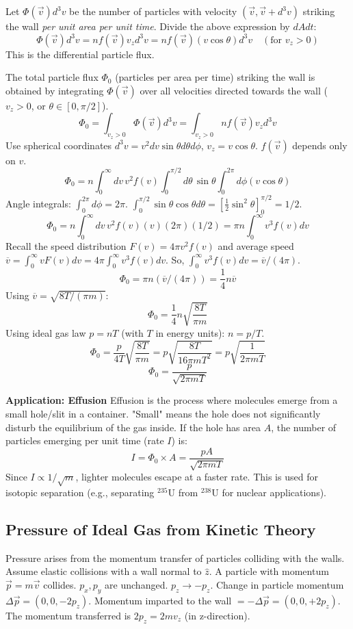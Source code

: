 \documentclass[11pt]{article}
\newcommand{\avg}[1]{\overline{#1}}
\begin{document}
Let $\Phi(\vec{v}) d^3v$ be the number of particles with velocity $(\vec{v}, \vec{v}+d^3v)$ striking the wall \emph{per unit area per unit time}. Divide the above expression by $dA dt$:
\[ \Phi(\vec{v}) d^3v = n f(\vec{v}) v_z d^3v = n f(\vec{v}) (v \cos\theta) d^3v \quad (\text{for } v_z>0) \]
This is the differential particle flux.

The total particle flux $\Phi_0$ (particles per area per time) striking the wall is obtained by integrating $\Phi(\vec{v})$ over all velocities directed towards the wall ($v_z > 0$, or $\theta \in [0, \pi/2]$).
\[ \Phi_0 = \int_{v_z>0} \Phi(\vec{v}) d^3v = \int_{v_z>0} n f(\vec{v}) v_z d^3v \]
Use spherical coordinates $d^3v = v^2 dv \sin\theta d\theta d\phi$, $v_z = v \cos\theta$. $f(\vec{v})$ depends only on $v$.
\[ \Phi_0 = n \int_0^\infty dv \, v^2 f(v) \int_0^{\pi/2} d\theta \, \sin\theta \int_0^{2\pi} d\phi (v \cos\theta) \]
Angle integrals: $\int_0^{2\pi} d\phi = 2\pi$. $\int_0^{\pi/2} \sin\theta \cos\theta d\theta = [\frac{1}{2}\sin^2\theta]_0^{\pi/2} = 1/2$.
\[ \Phi_0 = n \int_0^\infty dv \, v^2 f(v) (v) (2\pi) (1/2) = \pi n \int_0^\infty v^3 f(v) dv \]
Recall the speed distribution $F(v) = 4\pi v^2 f(v)$ and average speed $\avg{v} = \int_0^\infty v F(v) dv = 4\pi \int_0^\infty v^3 f(v) dv$.
So, $\int_0^\infty v^3 f(v) dv = \avg{v} / (4\pi)$.
\[ \Phi_0 = \pi n (\avg{v} / (4\pi)) = \frac{1}{4} n \avg{v} \]
Using $\avg{v} = \sqrt{8T/(\pi m)}$:
\[ \Phi_0 = \frac{1}{4} n \sqrt{\frac{8T}{\pi m}} \]
Using ideal gas law $p = nT$ (with $T$ in energy units): $n=p/T$.
\[ \Phi_0 = \frac{p}{4T} \sqrt{\frac{8T}{\pi m}} = p \sqrt{\frac{8T}{16 \pi m T^2}} = p \sqrt{\frac{1}{2\pi m T}} \]
\[ \Phi_0 = \frac{p}{\sqrt{2\pi m T}} \]

\textbf{Application: Effusion}
Effusion is the process where molecules emerge from a small hole/slit in a container. "Small" means the hole does not significantly disturb the equilibrium of the gas inside.
If the hole has area $A$, the number of particles emerging per unit time (rate $I$) is:
\[ I = \Phi_0 \times A = \frac{p A}{\sqrt{2\pi m T}} \]
Since $I \propto 1/\sqrt{m}$, lighter molecules escape at a faster rate. This is used for isotopic separation (e.g., separating $^{235}$U from $^{238}$U for nuclear applications).

\subsection*{Pressure of Ideal Gas from Kinetic Theory}

Pressure arises from the momentum transfer of particles colliding with the walls.
Assume elastic collisions with a wall normal to $\hat{z}$. A particle with momentum $\vec{p}=m\vec{v}$ collides. $p_x, p_y$ are unchanged. $p_z \to -p_z$.
Change in particle momentum $\Delta \vec{p} = (0, 0, -2p_z)$.
Momentum imparted to the wall $= -\Delta \vec{p} = (0, 0, +2p_z)$. The momentum transferred is $2p_z = 2mv_z$ (in z-direction).
\end{document}
